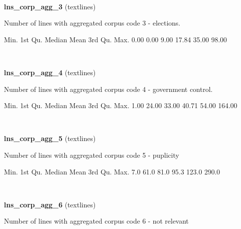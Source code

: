 \documentclass[]{article}
\newenvironment{Shaded}{\begin{snugshade}}{\end{snugshade}}
\newcommand{\FloatTok}[1]{\textcolor[rgb]{0.00,0.00,0.81}{{#1}}}
\newcommand{\NormalTok}[1]{{#1}}
\begin{document}
~

\vspace{1em}

\textbf{lns\_corp\_agg\_3} (textlines)

Number of lines with aggregated corpus code 3 - elections.

\begin{Shaded}
\begin{Highlighting}[]
   \NormalTok{Min. 1st Qu.  Median    Mean 3rd Qu.    Max. }
   \FloatTok{0.00}    \FloatTok{0.00}    \FloatTok{9.00}   \FloatTok{17.84}   \FloatTok{35.00}   \FloatTok{98.00} 
\end{Highlighting}
\end{Shaded}

~

\vspace{1em}

\textbf{lns\_corp\_agg\_4} (textlines)

Number of lines with aggregated corpus code 4 - government control.

\begin{Shaded}
\begin{Highlighting}[]
   \NormalTok{Min. 1st Qu.  Median    Mean 3rd Qu.    Max. }
   \FloatTok{1.00}   \FloatTok{24.00}   \FloatTok{33.00}   \FloatTok{40.71}   \FloatTok{54.00}  \FloatTok{164.00} 
\end{Highlighting}
\end{Shaded}

~

\vspace{1em}

\textbf{lns\_corp\_agg\_5} (textlines)

Number of lines with aggregated corpus code 5 - puplicity

\begin{Shaded}
\begin{Highlighting}[]
   \NormalTok{Min. 1st Qu.  Median    Mean 3rd Qu.    Max. }
    \FloatTok{7.0}    \FloatTok{61.0}    \FloatTok{81.0}    \FloatTok{95.3}   \FloatTok{123.0}   \FloatTok{290.0} 
\end{Highlighting}
\end{Shaded}

~

\vspace{1em}

\textbf{lns\_corp\_agg\_6} (textlines)

Number of lines with aggregated corpus code 6 - not relevant
\end{document}
